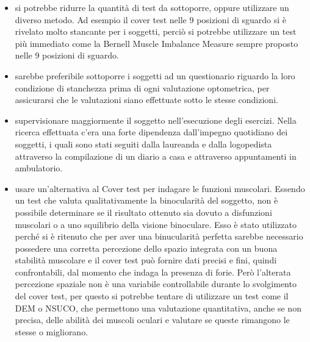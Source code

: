 \begin{itemize}
\item si potrebbe ridurre la quantità di test da sottoporre, oppure utilizzare un diverso metodo. Ad esempio il cover test nelle 9 posizioni di sguardo si è rivelato molto stancante per i soggetti, perciò si potrebbe utilizzare un test più immediato come la Bernell Muscle Imbalance Measure sempre proposto nelle 9 posizioni di sguardo.
\item sarebbe preferibile sottoporre i soggetti ad un questionario riguardo la loro condizione di stanchezza prima di ogni valutazione optometrica, per assicurarsi che le valutazioni siano effettuate sotto le stesse condizioni.
\item supervisionare maggiormente il soggetto nell’esecuzione degli esercizi. Nella ricerca effettuata c’era una forte dipendenza dall’impegno quotidiano dei soggetti, i quali sono stati seguiti dalla laureanda e dalla logopedista attraverso la compilazione di un diario a casa e attraverso appuntamenti in ambulatorio.
\item usare un’alternativa al Cover test per indagare le funzioni muscolari. Essendo un test che valuta qualitativamente la binocularità del soggetto, non è possibile determinare se il risultato ottenuto sia dovuto a disfunzioni muscolari o a uno squilibrio della visione binoculare. Esso è stato utilizzato perché si è ritenuto che per aver una binucularità perfetta sarebbe necessario possedere una corretta percezione dello spazio integrata con un buona stabilità muscolare e il cover test può fornire dati precisi e fini, quindi confrontabili, dal momento che indaga la presenza di forie\cite{bib15}. Però l’alterata percezione spaziale non è una variabile controllabile durante lo svolgimento del cover test, per questo si potrebbe tentare di utilizzare un test come il DEM o NSUCO, che permettono una valutazione quantitativa, anche se non precisa, delle abilità dei muscoli oculari e valutare se queste rimangono le stesse o migliorano.
\end{itemize}
